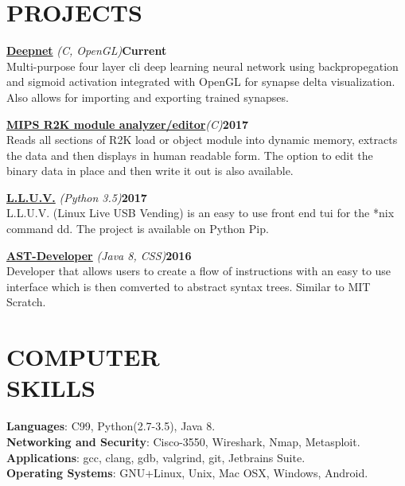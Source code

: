 \documentclass[line,margin]{res}
\begin{document}
\begin{resume}
\section{PROJECTS}
\par
    \href{https://github.com/jmp1617/deepnet.git}{\textbf{Deepnet}}
    {\sl (C, OpenGL)}\hfill \textbf{Current}\\ 
    Multi-purpose four layer cli deep learning neural network using 
    backpropegation and sigmoid activation integrated with OpenGL for synapse 
    delta visualization. Also allows for importing and exporting trained 
    synapses.
\par
    \href{https://github.com/jmp1617/lmedit.git}
    {\textbf{MIPS R2K module analyzer/editor}}{\sl (C)}\hfill \textbf{2017}\\
    Reads all sections of R2K load or object module into dynamic memory, 
    extracts the data and then displays in human readable form. The option to 
    edit the binary data in place and then write it out is also available.
\par
    \href{https://github.com/jmp1617/LLUV.git}{\textbf{L.L.U.V.}}
    {\sl (Python 3.5)}\hfill \textbf{2017}\\ 
    L.L.U.V. (Linux Live USB Vending) is an easy to use front end tui for the 
    *nix command dd. The project is available on Python Pip.
\par
    \href{https://github.com/jmp1617/ast-developer.git}{\textbf{AST-Developer}}
    {\sl (Java 8, CSS)}\hfill \textbf{2016}\\ 
    Developer that allows users to create a flow of instructions with an easy to
    use interface which is then comverted to abstract syntax trees. Similar to 
    MIT Scratch.

\section{COMPUTER\\SKILLS}
\textbf{Languages}: C99, Python(2.7-3.5), Java 8.
\\
\textbf{Networking and Security}: Cisco-3550, Wireshark, Nmap, Metasploit.  
\\
\textbf{Applications}: gcc, clang, gdb, valgrind, git, Jetbrains Suite. 
\\
\textbf{Operating Systems}: 
GNU+Linux, Unix, Mac OSX, Windows, Android.


\end{resume}
\end{document}
